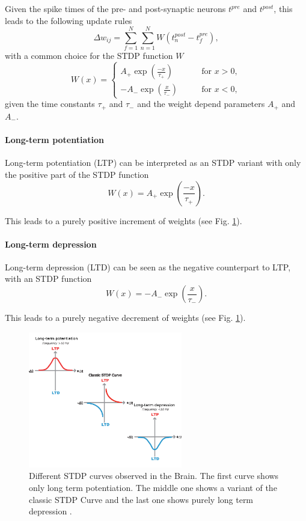 Given the spike times of the pre- and post-synaptic neurons $t^{pre}$ and $t^{post}$, this leads to the following update rules \cite{gerstner2014neuronal}\cite{Sjostrom2010}
\[
\Delta w_{ij} = \sum_{f=1}^N \sum_{n=1}^N W(t^{post}_n - t^{pre}_f),
\]
with a common choice for the STDP function $W$
\[
W(x) =
\begin{cases}
A_+ \exp(\frac{-x}{\tau_+}) \quad \quad &\text{for  } x > 0,  \\
-A_- \exp(\frac{x}{\tau_-}) \quad \quad &\text{for  } x < 0,
\end{cases}
\]
given the time constants $\tau_+$ and $\tau_-$ and the weight depend parameters $A_+$ and $A_-$.
     

\paragraph{Long-term potentiation} \label{c:ltp}
 
Long-term potentiation (LTP) can be interpreted as an STDP variant with only the positive part of the STDP function
\[
W(x) =  A_+ \exp(\frac{-x}{\tau_+}).
\]

This leads to a purely positive increment of weights (see Fig. \ref{fig:stdp}).

\paragraph{Long-term depression} \label{c:ldp}

Long-term depression (LTD) can be seen as the negative counterpart to LTP, with an STDP function
\[
W(x) =  -A_- \exp(\frac{x}{\tau_-}).
\]

This leads to a purely negative decrement of weights (see Fig. \ref{fig:stdp}).

\begin{figure}
	\centering
    	\includegraphics[width=0.6\textwidth]{imgs/stdp_curves.jpg} 
    \caption[STDP curves observed in the Brain.]{Different STDP curves observed in the Brain. The first curve shows only long term potentiation. The middle one shows a variant of the classic STDP Curve and the last one shows purely long term depression \cite{Buchanan2010}.}
	\label{fig:stdp}
\end{figure}